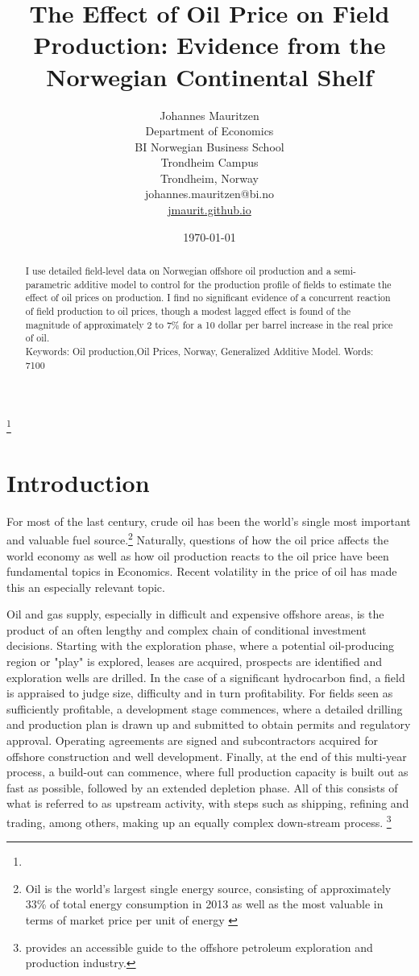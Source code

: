 \documentclass[12pt]{article}
\title{The Effect of Oil Price on Field Production: Evidence from the Norwegian Continental Shelf}
\author{Johannes Mauritzen\\
		Department of Economics\\
        BI Norwegian Business School\\
        Trondheim Campus\\
		Trondheim, Norway\\
        johannes.mauritzen@bi.no\\
        \url{jmaurit.github.io}\\
		}
\date{\today}
\begin{document}
 \begin{spacing}{1} %
	\maketitle

\begin{abstract}
I use detailed field-level data on Norwegian offshore oil production and a semi-parametric additive model to control for the production profile of fields to estimate the effect of oil prices on production. I find no significant evidence of a concurrent reaction of field production to oil prices, though a modest lagged effect is found of the magnitude of approximately 2 to 7\% for a 10 dollar per barrel increase in the real price of oil.\\
Keywords: Oil production,Oil Prices, Norway, Generalized Additive Model.
Words: 7100
\end{abstract}

\thanks{}
 \end{spacing}

\section{Introduction}

For most of the last century, crude oil has been the world's single most important and valuable fuel source.\footnote{Oil is the world's largest single energy source, consisting of approximately 33\% of total energy consumption in 2013 as well as the most valuable in terms of market price per unit of energy \citep{british_petroleum_statistical_2013}} Naturally, questions of how the oil price affects the world economy as well as how oil production reacts to the oil price have been fundamental topics in Economics. Recent volatility in the price of oil has made this an especially relevant topic.

Oil and gas supply, especially in difficult and expensive offshore areas, is the product of an often lengthy and complex chain of conditional investment decisions. Starting with the exploration phase, where a potential oil-producing region or "play" is explored, leases are acquired, prospects are identified and exploration wells are drilled. In the case of a significant hydrocarbon find, a field is appraised to judge size, difficulty and in turn profitability. For fields seen as sufficiently profitable, a development stage commences, where a detailed drilling and production plan is drawn up and submitted to obtain permits and regulatory approval. Operating agreements are signed and subcontractors acquired for offshore construction and well development. Finally, at the end of this multi-year process, a build-out can commence, where full production capacity is built out as fast as possible, followed by an extended depletion phase. All of this consists of what is referred to as upstream activity, with steps such as shipping, refining and trading, among others, making up an equally complex down-stream process. \footnote{\citet{lefler_deepwater_2011} provides an accessible guide to the offshore petroleum exploration and production industry.} 
\end{document}

